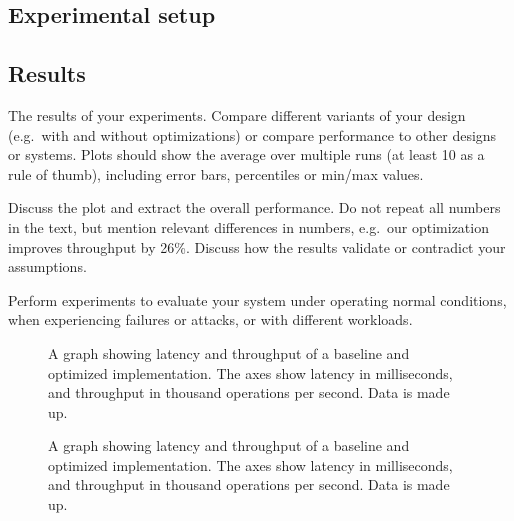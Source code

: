 
\subsection{Experimental setup}



\lipsum
\subsection{Results}
The results of your experiments. Compare different variants of your design (e.g.~with and without optimizations) or compare performance to other designs or systems. Plots should show the average over multiple runs (at least 10 as a rule of thumb), including error bars, percentiles or min/max values.

Discuss the plot and extract the overall performance. Do not repeat all numbers in the text, but mention relevant differences in numbers, e.g.~our optimization improves throughput by 26\%.
Discuss how the results validate or contradict your assumptions.

Perform experiments to evaluate your system under operating normal conditions, when experiencing failures or attacks, or with different workloads.


\begin{figure}
	\caption{A graph showing latency and throughput of a baseline and optimized implementation. The axes show latency in milliseconds, and throughput in thousand operations per second. Data is made up.}
\end{figure}

\begin{figure}
	\caption{A graph showing latency and throughput of a baseline and optimized implementation. The axes show latency in milliseconds, and throughput in thousand operations per second. Data is made up.}
\end{figure}


